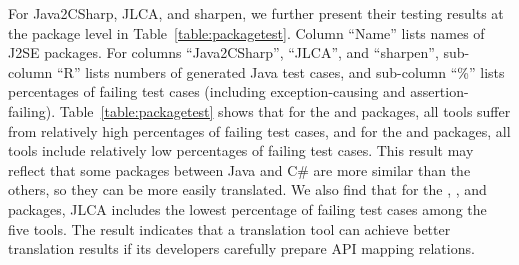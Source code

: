 For Java2CSharp, JLCA, and sharpen, we further present their testing results at the package level in Table~\ref{table:packagetest}. Column ``Name'' lists names of J2SE packages. For columns ``Java2CSharp'', ``JLCA'', and ``sharpen'', sub-column ``R'' lists numbers of generated Java test cases, and sub-column ``\%'' lists percentages of failing test cases (including exception-causing and assertion-failing). Table~\ref{table:packagetest} shows that for the  and  packages, all tools suffer from relatively high percentages of failing test cases, and for the  and  packages, all tools include relatively low percentages of failing test cases. This result may reflect that some packages between Java and C\# are more similar than the others, so they can be more easily translated. We also find that for the , , and  packages, JLCA includes the lowest percentage of failing test cases among the five tools. The result indicates that a translation tool can achieve better translation results if its developers carefully prepare API mapping relations.


